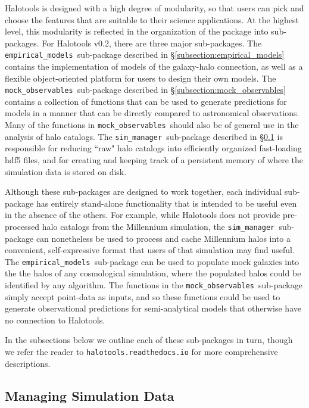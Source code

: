 \documentclass[twocolumn, tighten]{aastex6}
\newcommand{\mockobs}{{\tt mock\_observables }}
\newcommand{\emodels}{{\tt empirical\_models }}
\newcommand{\sims}{{\tt sim\_manager }}
\begin{document}
Halotools is designed with a high degree of modularity, so that users can pick and choose the features that are suitable to their science applications. At the highest level, this modularity is reflected in the organization of the package into sub-packages. For Halotools v0.2, there are three major sub-packages. The \emodels sub-package described in \S\ref{subsection:empirical_models} contains the implementation of models of the galaxy-halo connection, as well as a flexible object-oriented platform for users to design their own models. The \mockobs sub-package described in \S\ref{subsection:mock_observables} contains a collection of functions that can be used to generate predictions for models in a manner that can be directly compared to astronomical observations. Many of the functions in \mockobs should also be of general use in the analysis of halo catalogs. The \sims sub-package described in \S\ref{subsection:sim_manager} is responsible for reducing ``raw" halo catalogs into efficiently organized fast-loading hdf5 files, and for creating and keeping track of a persistent memory of where the simulation data is stored on disk. 

Although these sub-packages are designed to work together, each individual sub-package has entirely stand-alone functionality that is intended to be useful even in the absence of the others. For example, while Halotools does not provide pre-processed halo catalogs from the Millennium simulation, the \sims sub-package can nonetheless be used to process and cache Millennium halos into a convenient, self-expressive format that users of that simulation may find useful. The \emodels sub-package can be used to populate mock galaxies into the the halos of any cosmological simulation, where the populated halos could be identified by any algorithm. The functions in the \mockobs sub-package simply accept point-data as inputs, and so these functions could be used to generate observational predictions for semi-analytical models that otherwise have no connection to Halotools. 

In the subsections below we outline each of these sub-packages in turn, though we refer the reader to {\tt halotools.readthedocs.io} for more comprehensive descriptions. 

\subsection{Managing Simulation Data}
\label{subsection:sim_manager}
\end{document}
